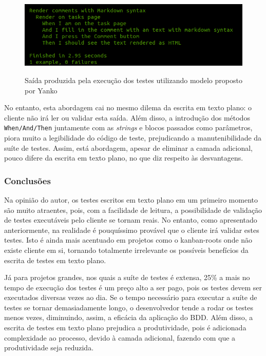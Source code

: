 \begin{figure}[h]
  \center
  \caption{Saída produzida pela execução dos testes utilizando modelo proposto por Yanko}
  \includegraphics[scale=0.6]{images/output-novo-modelo}
  \label{img:output-novo-modelo}
\end{figure}

No entanto, esta abordagem cai no mesmo dilema da escrita em texto plano: o cliente não irá ler ou validar esta saída. Além disso, a introdução dos métodos \texttt{When/And/Then} juntamente com as \textit{strings} e blocos passados como parâmetros, piora muito a legibilidade do código de teste, prejudicando a manutenibilidade da suíte de testes. Assim, está abordagem, apesar de eliminar a camada adicional, pouco difere da escrita em texto plano, no que diz respeito às desvantagens.


\subsubsection{Conclusões} %
\label{subsub:conclusoes_bdd}

Na opinião do autor, os testes escritos em texto plano em um primeiro momento são muito atraentes, pois, com a facilidade de leitura, a possibilidade de validação de testes executáveis pelo cliente se tornam reais. No entanto, como apresentado anteriormente, na realidade é pouquíssimo provável que o cliente irá validar estes testes. Isto é ainda mais acentuado em projetos como o kanban-roots onde não existe cliente em si, tornando totalmente irrelevante os possíveis benefícios da escrita de testes em texto plano.

Já para projetos grandes, nos quais a suíte de testes é extensa, 25\% a mais no tempo de execução dos testes é um preço alto a ser pago, pois os testes devem ser executados diversas vezes ao dia. Se o tempo necessário para executar a suíte de testes se tornar demasiadamente longo, o desenvolvedor tende a rodar os testes menos vezes, diminuindo, assim, a eficácia da aplicação do BDD. Além disso, a escrita de testes em texto plano prejudica a produtividade, pois é adicionada complexidade ao processo, devido à camada adicional, fazendo com que a produtividade seja reduzida.

